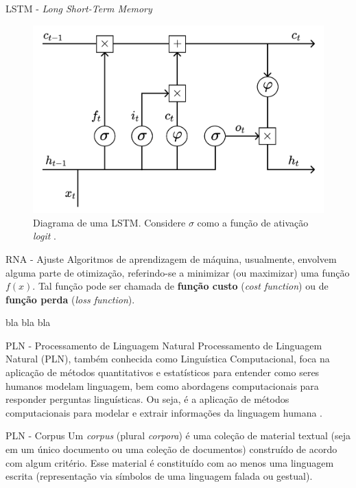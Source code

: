 \documentclass{beamer}
\begin{document}
    \begin{frame}{LSTM - \textit{Long Short-Term Memory}}
       \begin{figure}
            \centering
            \includegraphics[scale=0.25]{figuras/lstm_cell.pdf}
	        \caption{Diagrama de uma LSTM. Considere $\sigma$ como a função de ativação \textit{logit} \citep[adaptado de][]{kamath2019}.}
        \end{figure}
    \end{frame}

    \begin{frame}{RNA - Ajuste}
        Algoritmos de aprendizagem de máquina, usualmente, envolvem alguma parte de otimização, referindo-se a minimizar (ou maximizar) uma função $f(x)$. Tal função pode ser chamada de \textbf{função custo} (\textit{cost function}) ou de \textbf{função perda} (\textit{loss function}). 
        
        bla bla bla
    \end{frame}

    \begin{frame}{PLN - Processamento de Linguagem Natural}
        Processamento de Linguagem Natural (PLN), também conhecida como Linguística Computacional, foca na aplicação de métodos quantitativos e estatísticos para entender como seres humanos modelam linguagem, bem como abordagens computacionais para responder perguntas linguísticas. Ou seja, é a aplicação de métodos computacionais para modelar e extrair informações da linguagem humana \citep{kamath2019}.
    \end{frame}
    
    \begin{frame}{PLN - Corpus}
        Um \textit{corpus} (plural \textit{corpora}) é uma coleção de material textual (seja em um único documento ou uma coleção de documentos) construído de acordo com algum critério. Esse material é constituído com ao menos uma linguagem escrita (representação via símbolos de uma linguagem falada ou gestual).
    \end{frame}
    
\end{document}
